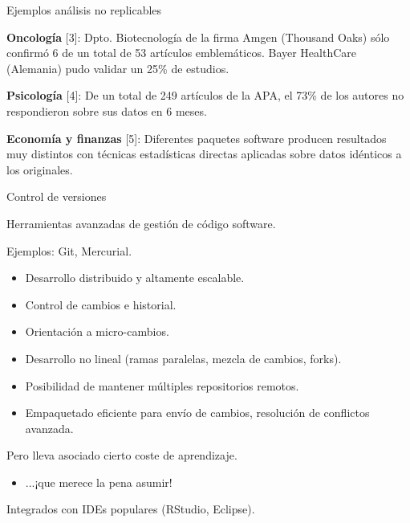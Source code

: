 \begin{frame}{Ejemplos análisis no replicables}
 \begin{wideitemize}
  \item \textbf{Oncología} [3]: Dpto. Biotecnología de la firma Amgen (Thousand 
  Oaks) sólo confirmó 6 de un total de 53 artículos emblemáticos. Bayer 
  HealthCare (Alemania) pudo validar un 25\% de estudios.
  \item \textbf{Psicología} [4]: De un total de 249 artículos de la APA, el 73\% 
  de los autores no respondieron sobre sus datos en 6 meses.
  \item \textbf{Economía y finanzas} [5]: Diferentes paquetes software producen 
  resultados muy distintos con técnicas estadísticas directas aplicadas sobre 
  datos idénticos a los originales.
 \end{wideitemize}

\end{frame}


\begin{frame}{Control de versiones}
 \begin{wideitemize}
  \item Herramientas avanzadas de gestión de código software.
  \item Ejemplos: Git, Mercurial.
  \begin{itemize}
   \item Desarrollo distribuido y altamente escalable.
   \item Control de cambios e historial.
   \item Orientación a micro-cambios.
   \item Desarrollo no lineal (ramas paralelas, mezcla de cambios, forks).
   \item Posibilidad de mantener múltiples repositorios remotos.
   \item Empaquetado eficiente para envío de cambios, resolución de conflictos avanzada.
  \end{itemize}

 \item Pero lleva asociado cierto coste de aprendizaje.
 \begin{itemize}
  \item ...¡que merece la pena asumir!
 \end{itemize}

 \item Integrados con IDEs populares (RStudio, Eclipse).

 \end{wideitemize}

\end{frame}

